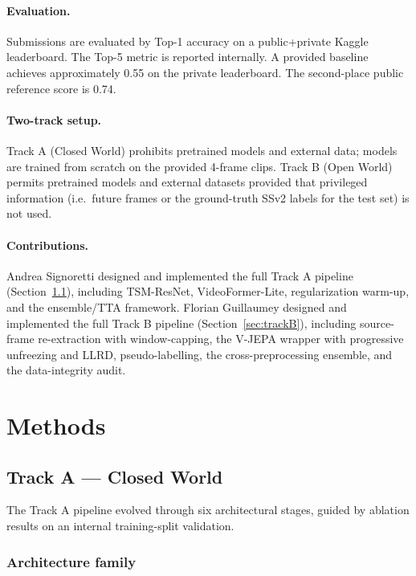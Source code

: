 \documentclass[10pt,twocolumn,letterpaper]{article}
\begin{document}
\paragraph{Evaluation.}
Submissions are evaluated by Top-1 accuracy on a public+private Kaggle
leaderboard.  The Top-5 metric is reported internally.  A provided
baseline achieves approximately 0.55 on the private leaderboard.  The
second-place public reference score is 0.74.

\paragraph{Two-track setup.}
Track A (Closed World) prohibits pretrained models and external data;
models are trained from scratch on the provided 4-frame clips.  Track B
(Open World) permits pretrained models and external datasets provided
that privileged information (i.e.\ future frames or the ground-truth
SSv2 labels for the test set) is not used.

\paragraph{Contributions.}
Andrea Signoretti designed and implemented the full Track A pipeline
(Section~\ref{sec:trackA}), including TSM-ResNet, VideoFormer-Lite,
regularization warm-up, and the ensemble/TTA framework.  Florian
Guillaumey designed and implemented the full Track B pipeline
(Section~\ref{sec:trackB}), including source-frame re-extraction with
window-capping, the V-JEPA wrapper with progressive unfreezing and LLRD,
pseudo-labelling, the cross-preprocessing ensemble, and the data-integrity
audit.

\section{Methods}
\label{sec:methods}

\subsection{Track A — Closed World}
\label{sec:trackA}

The Track A pipeline evolved through six architectural stages, guided by
ablation results on an internal training-split validation.

\subsubsection{Architecture family}
\end{document}
